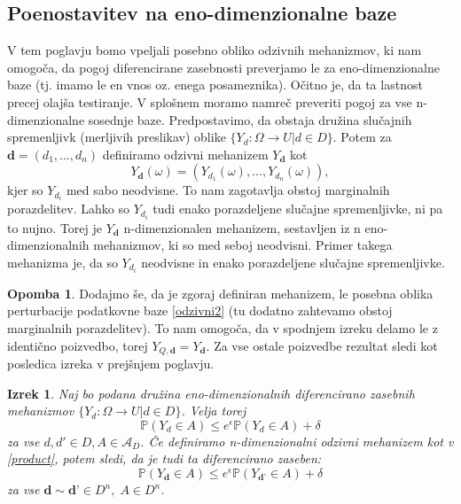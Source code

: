 \documentclass[12pt,a4paper]{amsart}
\theoremstyle{definition} %
\newtheorem{opomba}[definicija]{Opomba}
\theoremstyle{plain} %
\newtheorem{izrek}[definicija]{Izrek}
\begin{document}
\subsection{Poenostavitev na eno-dimenzionalne baze}
V tem poglavju bomo vpeljali posebno obliko odzivnih mehanizmov, ki nam omogoča, da pogoj diferencirane zasebnosti preverjamo le za eno-dimenzionalne baze (tj. imamo le en vnos oz. enega posameznika). Očitno je, da ta lastnost precej olajša testiranje. V splošnem moramo namreč preveriti pogoj za vse n-dimenzionalne sosednje baze.
\newline
\newline
Predpostavimo, da obstaja družina slučajnih spremenljivk (merljivih preslikav) oblike $\{ Y_d: \Omega \rightarrow U | d \in D\}$.  Potem za $\textbf{d} = (d_1,...,d_n)$ definiramo odzivni mehanizem $Y_{\textbf{d}}$ kot  
\begin{equation}\label{product}
Y_{\textbf{d}} (\omega) = (Y_{d_1} (\omega) , ... , Y_{d_n} (\omega)), \tag{5}
\end{equation}
kjer so $Y_{d_i}$ med sabo neodvisne. To nam zagotavlja obstoj marginalnih porazdelitev.  Lahko so $Y_{d_i}$ tudi enako porazdeljene slučajne spremenljivke, ni pa to nujno. Torej je $Y_{\textbf{d}}$ n-dimenzionalen mehanizem, sestavljen iz n eno-dimenzionalnih mehanizmov, ki so med seboj neodvisni. Primer takega mehanizma je, da so $Y_{d_i}$ neodvisne in enako porazdeljene slučajne spremenljivke.
\newline
\newline
\begin{opomba} Dodajmo še, da je zgoraj definiran mehanizem, le posebna oblika perturbacije podatkovne baze \eqref{odzivni2} (tu dodatno zahtevamo obstoj marginalnih porazdelitev). To nam omogoča, da v spodnjem izreku delamo le z identično poizvedbo, torej $Y_{Q, \textbf{d}}=Y_{\textbf{d}}$. Za vse ostale poizvedbe rezultat sledi kot posledica izreka v prejšnjem poglavju. 
\end{opomba}
\begin{izrek} Naj bo podana družina eno-dimenzionalnih diferencirano zasebnih mehanizmov $\{ Y_d: \Omega \rightarrow U | d \in D\}$. Velja torej
$$\mathbb{P}(Y_d \in A) \leq e^\epsilon \mathbb{P}(Y_d \in A) + \delta$$ 
za vse $d,d' \in D, A \in \mathcal{A}_D$. Če definiramo n-dimenzionalni odzivni mehanizem kot v \eqref{product}, potem sledi, da je tudi ta diferencirano zaseben:
$$\mathbb{P}(Y_{\textbf{d}} \in A) \leq e^\epsilon \mathbb{P}(Y_{\textbf{d'}} \in A) + \delta$$
za vse $\textbf{d} \sim \textbf{d'} \in D^n, \; A \in D^n$.
\end{izrek}
\end{document}
